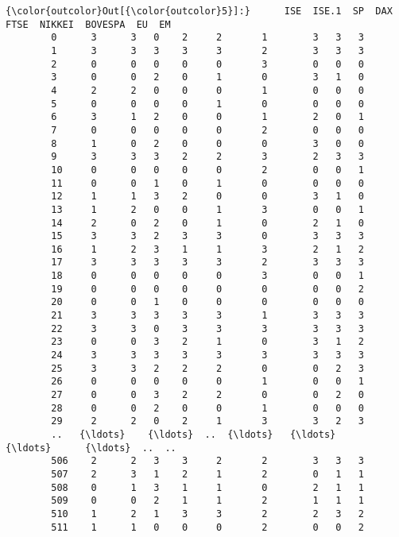 \documentclass[11pt]{article}
\begin{document}
\begin{Verbatim}[commandchars=\\\{\}]
{\color{outcolor}Out[{\color{outcolor}5}]:}      ISE  ISE.1  SP  DAX  FTSE  NIKKEI  BOVESPA  EU  EM
        0      3      3   0    2     2       1        3   3   3
        1      3      3   3    3     3       2        3   3   3
        2      0      0   0    0     0       3        0   0   0
        3      0      0   2    0     1       0        3   1   0
        4      2      2   0    0     0       1        0   0   0
        5      0      0   0    0     1       0        0   0   0
        6      3      1   2    0     0       1        2   0   1
        7      0      0   0    0     0       2        0   0   0
        8      1      0   2    0     0       0        3   0   0
        9      3      3   3    2     2       3        2   3   3
        10     0      0   0    0     0       2        0   0   1
        11     0      0   1    0     1       0        0   0   0
        12     1      1   3    2     0       0        3   1   0
        13     1      2   0    0     1       3        0   0   1
        14     2      0   2    0     1       0        2   1   0
        15     3      3   2    3     3       0        3   3   3
        16     1      2   3    1     1       3        2   1   2
        17     3      3   3    3     3       2        3   3   3
        18     0      0   0    0     0       3        0   0   1
        19     0      0   0    0     0       0        0   0   2
        20     0      0   1    0     0       0        0   0   0
        21     3      3   3    3     3       1        3   3   3
        22     3      3   0    3     3       3        3   3   3
        23     0      0   3    2     1       0        3   1   2
        24     3      3   3    3     3       3        3   3   3
        25     3      3   2    2     2       0        0   2   3
        26     0      0   0    0     0       1        0   0   1
        27     0      0   3    2     2       0        0   2   0
        28     0      0   2    0     0       1        0   0   0
        29     2      2   0    2     1       3        3   2   3
        ..   {\ldots}    {\ldots}  ..  {\ldots}   {\ldots}     {\ldots}      {\ldots}  ..  ..
        506    2      2   3    3     2       2        3   3   3
        507    2      3   1    2     1       2        0   1   1
        508    0      1   3    1     1       0        2   1   1
        509    0      0   2    1     1       2        1   1   1
        510    1      2   1    3     3       2        2   3   2
        511    1      1   0    0     0       2        0   0   2

\end{Verbatim}
\end{document}
